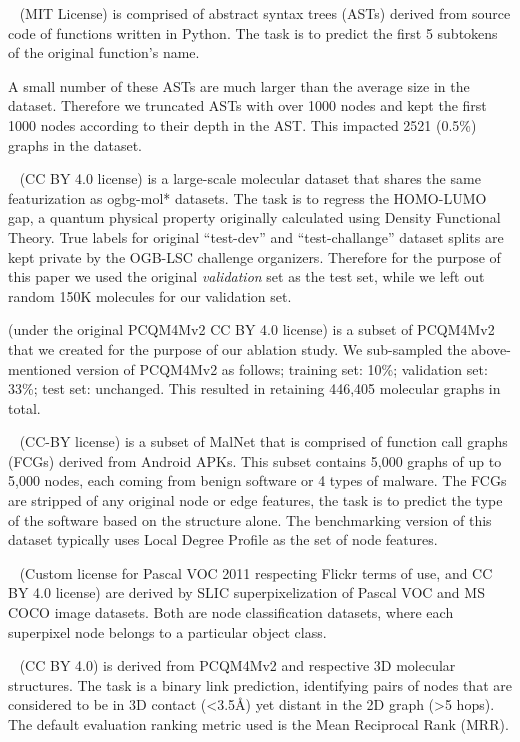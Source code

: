 \documentclass{article}
\begin{document}
~\cite{hu2020ogb} (MIT License) is comprised of abstract syntax trees (ASTs) derived from source code of functions written in Python. The task is to predict the first 5 subtokens of the original function's name.

A small number of these ASTs are much larger than the average size in the dataset. Therefore we truncated ASTs with over 1000 nodes and kept the first 1000 nodes according to their depth in the AST. This impacted 2521 (0.5\%) graphs in the dataset.

~\cite{hu2021ogblsc} (CC BY 4.0 license) is a large-scale molecular dataset that shares the same featurization as ogbg-mol* datasets. The task is to regress the HOMO-LUMO gap, a quantum physical property originally calculated using Density Functional Theory. True labels for original ``test-dev'' and ``test-challange'' dataset splits are kept private by the OGB-LSC challenge organizers. Therefore for the purpose of this paper we used the original \emph{validation} set as the test set, while we left out random 150K molecules for our validation set.

 (under the original PCQM4Mv2 CC BY 4.0 license) is a subset of PCQM4Mv2~\cite{hu2021ogblsc} that we created for the purpose of our ablation study. We sub-sampled the above-mentioned version of PCQM4Mv2 as follows; training set: 10\%; validation set: 33\%; test set: unchanged. This resulted in retaining 446,405 molecular graphs in total.

~\cite{freitas2021malnet} (CC-BY license) is a subset of MalNet that is comprised of function call graphs (FCGs) derived from Android APKs. This subset contains 5,000 graphs of up to 5,000 nodes, each coming from benign software or 4 types of malware. The FCGs are stripped of any original node or edge features, the task is to predict the type of the software based on the structure alone. The benchmarking version of this dataset typically uses Local Degree Profile as the set of node features.

~\cite{dwivedi2022LRGB} (Custom license for Pascal VOC 2011 respecting Flickr terms of use, and CC BY 4.0 license)
are derived by SLIC superpixelization of Pascal VOC and MS COCO image datasets. Both are node classification datasets, where each superpixel node belongs to a particular object class.

~\cite{dwivedi2022LRGB} (CC BY 4.0) is derived from PCQM4Mv2 and respective 3D molecular structures. The task is a binary link prediction, identifying pairs of nodes that are considered to be in 3D contact (<3.5{\AA}) yet distant in the 2D graph (>5 hops). The default evaluation ranking metric used is the Mean Reciprocal Rank (MRR).
\end{document}
